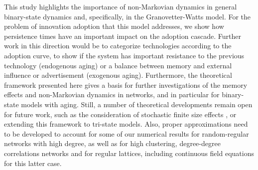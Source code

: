 


This study highlights the importance of non-Markovian dynamics in general  binary-state dynamics and, specifically, in the Granovetter-Watts model. For the problem of innovation adoption that this model addresses, we show how persistence times have an important impact on the adoption cascade. Further work in this direction would be to categorize technologies according to the adoption curve, to show if the system has important resistance to the previous technology (endogenous aging) or a balance between memory and external influence or advertisement (exogenous aging). Furthermore, the theoretical framework presented here gives a basis for further investigations of the memory effects and non-Markovian dynamics in networks, and in particular for  binary-state models with aging. Still, a number of theoretical developments remain open for future work, such as the consideration of stochastic finite size effects \cite{peralta-2020B}, or extending this framework to tri-state models. Also, proper approximations need to be developed to account for some of our numerical results for random-regular networks with high degree, as well as for high clustering, degree-degree correlations networks and for regular lattices, including continuous field equations for this latter case. 
